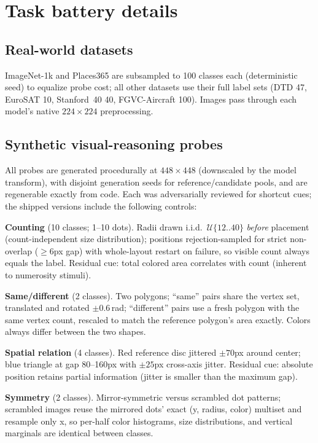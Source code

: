 \documentclass{article}
\begin{document}



\clearpage
\appendix

\section{Task battery details}
\label{app:synthetic}

\subsection{Real-world datasets}
ImageNet-1k and Places365 are subsampled to 100 classes each
(deterministic seed) to equalize probe cost; all other datasets use their
full label sets (DTD 47, EuroSAT 10, Stanford~40 40, FGVC-Aircraft 100).
Images pass through each model's native $224{\times}224$ preprocessing.

\subsection{Synthetic visual-reasoning probes}
All probes are generated procedurally at $448{\times}448$ (downscaled by
the model transform), with disjoint generation seeds for
reference/candidate pools, and are regenerable exactly from code. Each
was adversarially reviewed for shortcut cues; the shipped versions
include the following controls:

\textbf{Counting} (10 classes; 1--10 dots). Radii drawn i.i.d.\
$\mathcal{U}\{12..40\}$ \emph{before} placement (count-independent size
distribution); positions rejection-sampled for strict non-overlap
($\ge 6$px gap) with whole-layout restart on failure, so visible count
always equals the label. Residual cue: total colored area correlates with
count (inherent to numerosity stimuli).

\textbf{Same/different} (2 classes). Two polygons; ``same'' pairs share
the vertex set, translated and rotated $\pm 0.6$\,rad; ``different''
pairs use a fresh polygon with the same vertex count, rescaled to match
the reference polygon's area exactly. Colors always differ between the
two shapes.

\textbf{Spatial relation} (4 classes). Red reference disc jittered
$\pm 70$px around center; blue triangle at gap 80--160px with $\pm 25$px
cross-axis jitter. Residual cue: absolute position retains partial
information (jitter is smaller than the maximum gap).

\textbf{Symmetry} (2 classes). Mirror-symmetric versus scrambled dot
patterns; scrambled images reuse the mirrored dots' exact (y, radius,
color) multiset and resample only x, so per-half color histograms, size
distributions, and vertical marginals are identical between classes.
\end{document}
